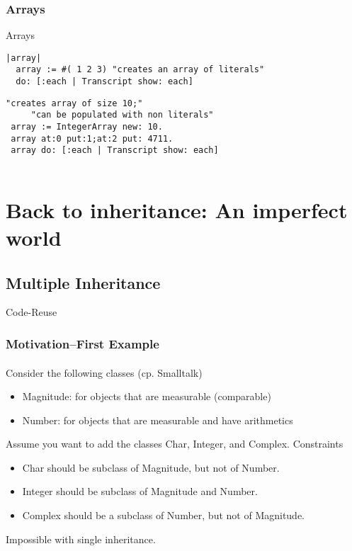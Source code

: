 \documentclass{beamer}
\newcommand{\Blue}[1]{\color{blue}#1\color{black}}
\begin{document}
\begin{frame}[fragile]
\frametitle{Arrays}

\Blue{Arrays}\medskip

\begin{lstlisting}[language=Smalltalk]
|array| 
  array := #( 1 2 3) "creates an array of literals"
  do: [:each | Transcript show: each] 
\end{lstlisting} 



\begin{lstlisting}[language=Smalltalk]
 "creates array of size 10;"
     "can be populated with non literals"
 array := IntegerArray new: 10. 
 array at:0 put:1;at:2 put: 4711.
 array do: [:each | Transcript show: each] 
  
\end{lstlisting} 

\end{frame}

\section{Back to inheritance: An imperfect world}

\subsection{Multiple Inheritance}
\begin{frame}[fragile]
\begin{center}\Huge Code-Reuse\end{center}
\end{frame}

\begin{frame}[fragile]
\frametitle{Motivation--First Example}
\framesubtitle{}
Consider the following classes (cp. Smalltalk)
\begin{itemize}
\item Magnitude: for objects that are measurable (comparable)
\item Number: for objects that are measurable and have arithmetics
\end{itemize}
Assume you want to add the classes Char, Integer, and Complex.
Constraints
\begin{itemize}
\item Char should be subclass of Magnitude, but not of Number.
\item Integer should be subclass of Magnitude and Number.
\item Complex should be a subclass of Number, but not of Magnitude.
\end{itemize}
Impossible with single inheritance.
\end{frame}
\end{document}
